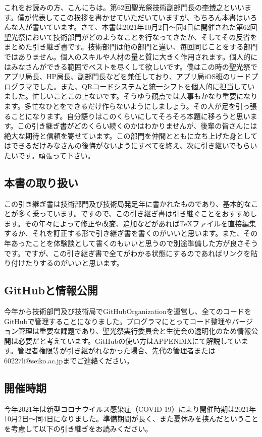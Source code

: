 \documentclass[dvipdfmx,jb5]{jarticle}
\newcommand{\mail}[2]{\href{#2}{#1}}
\begin{document}
これをお読みの方、こんにちは。第62回聖光祭技術副部門長の\mail{李博之}{60227li@seiko.ac.jp}といいます。僕が代表してこの挨拶を書かせていただいていますが、もちろん本書はいろんな人が書いています。さて、本書は2021年10月2日〜同4日に開催された第62回聖光祭において技術部門がどのようなことを行なってきたか、そしてその反省をまとめた引き継ぎ書です。技術部門は他の部門と違い、毎回同じことをする部門ではありません。個人のスキルや人材の量と質に大きく作用されます。個人的にはみなさんができる範囲でベストを尽くして欲しいです。僕はこの時の聖光祭でアプリ局長、HP局長、副部門長などを兼任しており、アプリ局iOS班のリードプログラマでした。また、QRコードシステムと統一シフトを個人的に担当していました。忙しいことこの上ないです。そうゆう観点では人事もかなり重要になります。多忙なひとをできるだけ作らないようにしましょう。その人が足を引っ張ることになります。自分語りはこのくらいにしてそろそろ本題に移ろうと思います。この引き継ぎ書がどのくらい続くのかはわかりませんが、後輩の皆さんには絶大な期待と信頼を寄せています。この部門を仲間とともに立ち上げた身としてはできるだけみなさんの後悔がないようにすべてを終え、次に引き継いでもらいたいです。頑張って下さい。
\subsection{本書の取り扱い}
この引き継ぎ書は技術部門及び技術局発足年に書かれたものであり、基本的なことが多く乗っています。ですので、この引き継ぎ書は引き継ぐことをおすすめします。その年々によって修正や改変、追加などがあれば\TeX ファイルを直接編集するか、それを訂正する形で引き継ぎ書を書くのがいいと思います。また、その年あったことを体験談として書くのもいいと思うので別途準備した方が良さそうです。ですが、この引き継ぎ書で全てがわかる状態にするのであればリンクを貼り付けたりするのがいいと思います。
\subsection{GitHubと情報公開}
今年から技術部門及び技術局でGitHubOrganizationを運営し、全てのコードをGitHubで管理することになりました。プログラマにとってコード整理やバージョン管理は重要な課題であり、聖光祭実行委員会と生徒会の透明化のため情報公開は必要だと考えています。GitHubの使い方はAPPENDIXにて解説しています。管理者権限等が引き継がれなかった場合、先代の管理者または {\ttfamily 60227li@seiko.ac.jp}までご連絡ください。
\subsection{開催時期}
今年2021年は新型コロナウイルス感染症（COVID-19）により開催時期は2021年10月2日〜同4日になりました。準備期間が長く、また夏休みを挟んだということを考慮して以下の引き継ぎをお読みください。
\end{document}
